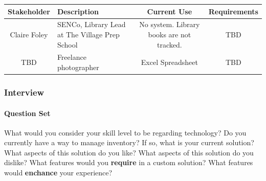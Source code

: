 \documentclass{article}
\begin{document}
\newcommand{\stakeholderEntry}[4]{{#1} & {#2} & {#3} & {#4}\\\hline}

\begin{tabular}{ |c|p{}|c|c| }
    \hline
    \textbf{Stakeholder} & \textbf{Description} & \textbf{Current Use} & \textbf{Requirements}\\
    \hline

    \stakeholderEntry
        {Claire Foley}
        {SENCo, Library Lead at The Village Prep School}
        {No system. Library books are not tracked.}
        {TBD}
    
    \stakeholderEntry
        {TBD}{Freelance photographer}{Excel Spreadsheet}{TBD}
    \hline
\end{tabular}


\subsubsection{Interview}

\paragraph{Question Set}
\begin{outline}
    \1 What would you consider your skill level to be regarding technology?
    \1 Do you currently have a way to manage inventory?
    \2 If so, what is your current solution?
    \3 What aspects of this solution do you like?
    \3 What aspects of this solution do you dislike?
    \2 What features would you \textbf{require} in a custom solution?
    \2 What features would \textbf{enchance} your experience?
\end{outline}
\end{document}

